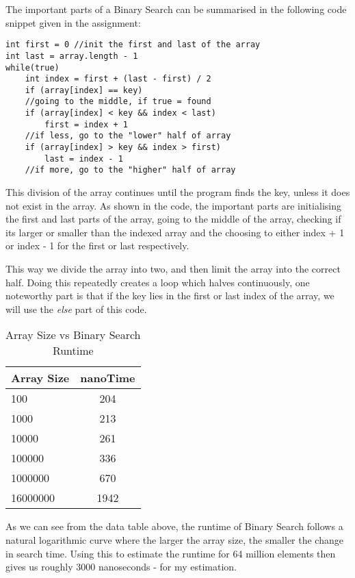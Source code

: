 \documentclass[a4paper,11pt]{article}
\begin{document}
The important parts of a Binary Search can be summarised in the following code snippet given in the assignment:
\begin{verbatim}
int first = 0 //init the first and last of the array
int last = array.length - 1
while(true)
    int index = first + (last - first) / 2
    if (array[index] == key)
    //going to the middle, if true = found
    if (array[index] < key && index < last)
        first = index + 1
    //if less, go to the "lower" half of array
    if (array[index] > key && index > first)
        last = index - 1
    //if more, go to the "higher" half of array
\end{verbatim}

This division of the array continues until the program finds the key, unless it does not exist in the array. As shown in the code, the important parts are initialising the first and last parts of the array, going to the middle of the array, checking if its larger or smaller than the indexed array and the choosing to either index + 1 or index - 1 for the first or last respectively. 

This way we divide the array into two, and then limit the array into the correct half. Doing this repeatedly creates a loop which halves continuously, one noteworthy part is that if the key lies in the first or last index of the array, we will use the {\em else} part of this code.

\begin{table}[h]
\begin{center}
\begin{tabular}{l|c}
\textbf{Array Size} & \textbf{nanoTime}\\
\hline
  100      &  204  \\
  1000     &  213  \\
  10000    &  261  \\
  100000   &  336  \\
  1000000  &  670  \\
  16000000 &  1942 \\

\end{tabular}
\caption{Array Size vs Binary Search Runtime}
\label{tab:table3}
\end{center}
\end{table}

As we can see from the data table above, the runtime of Binary Search follows a natural logarithmic curve where the larger the array size, the smaller the change in search time. Using this to estimate the runtime for 64 million elements then gives us roughly 3000 nanoseconds - for my estimation. 
\end{document}
